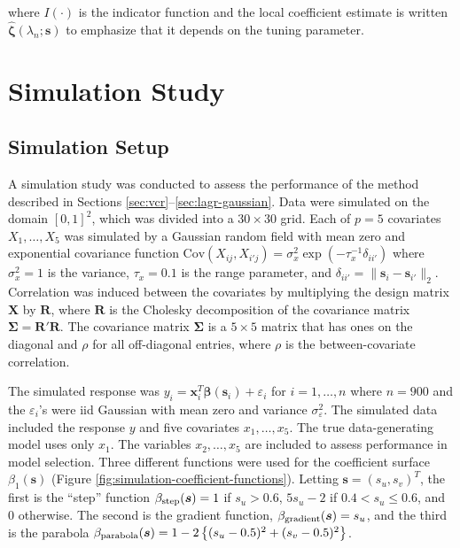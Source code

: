 \documentclass[authoryear,review, 12pt]{elsarticle}
\begin{document}
where $I\left(\cdot\right)$ is the indicator function and the local
coefficient estimate is written $\hat{\bm{\zeta}}(\lambda_{n};\bm{s})$
to emphasize that it depends on the tuning parameter.


\section{Simulation Study\label{sec:simulations}}




\subsection{Simulation Setup}

A simulation study was conducted to assess the performance of the
method described in Sections \ref{sec:vcr}--\ref{sec:lagr-gaussian}.
Data were simulated on the domain $[0,1]^{2}$, which was divided
into a $30\times30$ grid. Each of $p=5$ covariates $X_{1},\dots,X_{5}$
was simulated by a Gaussian random field with mean zero and exponential
covariance function $\text{Cov}\left(X_{ij},X_{i'j}\right)=\sigma_{x}^{2}\exp\left(-\tau_{x}^{-1}\delta_{ii'}\right)$
where $\sigma_{x}^{2}=1$ is the variance, $\tau_{x}=0.1$ is the
range parameter, and $\delta_{ii'}=\|\bm{s}_{i}-\bm{s}_{i'}\|_{2}$.
Correlation was induced between the covariates by multiplying the
design matrix $\bm{X}$ by $\bm{R}$, where $\bm{R}$ is the Cholesky
decomposition of the covariance matrix $\bm{\Sigma}=\bm{R}'\bm{R}$.
The covariance matrix $\bm{\Sigma}$ is a $5\times5$ matrix that
has ones on the diagonal and $\rho$ for all off-diagonal entries,
where $\rho$ is the between-covariate correlation. 

The simulated response was $y_{i}=\bm{x}_{i}^{T}\bm{\beta}(\bm{s}_{i})+\varepsilon_{i}$
for $i=1,\dots,n$ where $n=900$ and the $\varepsilon_{i}$'s were
iid Gaussian with mean zero and variance $\sigma_{\varepsilon}^{2}$.
The simulated data included the response $y$ and five covariates
$x_{1},\dots,x_{5}$. The true data-generating model uses only $x_{1}$.
The variables $x_{2},\dots,x_{5}$ are included to assess performance
in model selection. Three different functions were used for the coefficient
surface $\beta_{1}(\bm{s})$ (Figure \ref{fig:simulation-coefficient-functions}).
Letting $\bm{s}=(s_{u},s_{v})^{T}$, the first is the ``step'' function
$\beta_{{\rm step}}(\bm{s})=1$ if $s_{u}>0.6$, $5s_{u}-2$ if $0.4<s_{u}\le0.6$,
and $0$ otherwise. The second is the gradient function, $\beta_{{\rm gradient}}(\bm{s})=s_{u}$,
and the third is the parabola $\beta_{{\rm parabola}}(\bm{s})=1-2\left\{ (s_{u}-0.5)^{2}+(s_{v}-0.5)^{2}\right\} $.
\end{document}
